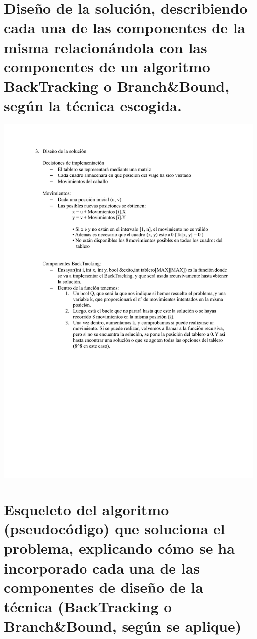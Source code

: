 \documentclass[a4paper, 11pt]{article}
\begin{document}
\section{Diseño de la solución, describiendo cada una de las componentes de la misma relacionándola con las componentes de un algoritmo BackTracking o Branch\&Bound, según la técnica escogida.}
\includegraphics[width=\textwidth]{sol.pdf}

\section{Esqueleto del algoritmo (pseudocódigo) que soluciona el problema, explicando cómo se ha incorporado cada una de las componentes de diseño de la técnica (BackTracking o Branch\&Bound, según se aplique)}
\end{document}
